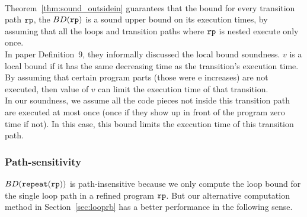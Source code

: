 \\
Theorem~\ref{thm:sound_outsidein} guarantees that
the bound for every transition path $\mathtt{rp}$, the $BD(\mathtt{rp})$
is a sound upper bound on its execution times, by assuming
that all the loops and transition paths where $\mathtt{rp}$ is nested execute only once.
\\
In paper \cite{sinn2017complexity} Definition~9, they informally discussed the local bound soundness.
$v$ is a local bound if it has the same decreasing time as the transition's execution time.
By assuming that certain program parts (those were e increases) are not executed,
then value of $v$ can limit the execution time of that transition.
\\
In our soundness, we assume all the code pieces not inside this transition path are executed at most once (once if they show up in front of the program
zero time if not).
In this case, this bound limits the execution time of this transition path.

\subsubsection{Path-sensitivity}
$BD(\mathtt{repeat}({\mathtt{rp}}))$  is path-insensitive because we only compute the loop bound
for the single loop path in a refined program $\mathtt{rp}$.
But our alternative computation method in Section~\ref{sec:looprb} has a better performance in the following sense.


